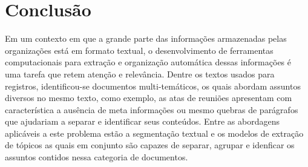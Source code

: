 \chapter*[Conclusão]{Conclusão}
\label{cap:conclusao}




Em um contexto em que a grande parte das informações armazenadas pelas organizações está em formato textual, o desenvolvimento de ferramentas computacionais para extração e organização automática dessas informações é uma tarefa que retem atenção e relevância.
Dentre os textos usados para registros, identificou-se documentos multi-temáticos, os quais abordam assuntos diversos no mesmo texto, como exemplo, as atas de reuniões apresentam com característica a ausência de meta informações ou mesmo quebras de parágrafos que ajudariam a separar e identificar seus conteúdos. 
Entre as abordagens aplicáveis a este problema estão a segmentação textual e os modelos de extração de tópicos as quais em conjunto são capazes de separar, agrupar e idenficar os assuntos contidos nessa categoria de documentos.







